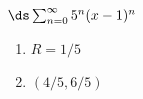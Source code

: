 {$\ds\sum_{n=0}^\infty 5^n(x-1)^{n}$
}
{\begin{enumerate}
	\item $R=1/5$
	\item	$(4/5,6/5)$
\end{enumerate}
}